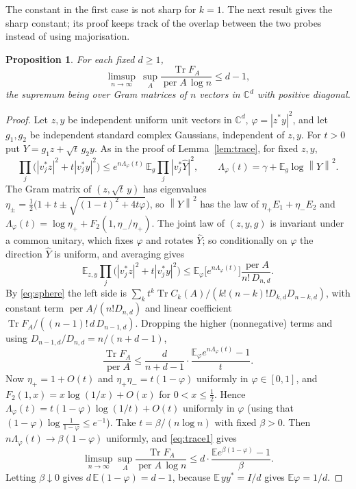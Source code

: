 \documentclass[11pt,a4paper]{article}
\newtheorem{proposition}[theorem]{Proposition}
\theoremstyle{remark}
\newcommand{\per}{\operatorname{per}}
\newcommand{\Tr}{\operatorname{Tr}}
\newcommand{\norm}[1]{\left\lVert#1\right\rVert}
\newcommand{\C}{\mathbb C}
\newcommand{\E}{\mathbb E}
\begin{document}
The constant in the first case is not sharp for $k=1$. The next result gives the sharp constant; its proof keeps track of the overlap between the two probes instead of using majorisation.
\begin{proposition}\label{prop:trace1}
For each fixed $d\ge1$,
\[
 \limsup_{n\to\infty}\ \sup_A\frac{\Tr F_A}{\per A\,\log n}\le d-1,
\]
the supremum being over Gram matrices of $n$ vectors in $\C^d$ with positive diagonal.
\end{proposition}
\begin{proof}
Let $z,y$ be independent uniform unit vectors in $\C^d$, $\varphi=|z^*y|^2$, and let $g_1,g_2$ be independent standard complex Gaussians, independent of $z,y$. For $t>0$ put $Y=g_1z+\sqrt t\,g_2y$. As in the proof of Lemma~\ref{lem:trace}, for fixed $z,y$,
\[
 \prod_j\bigl(|v_j^*z|^2+t|v_j^*y|^2\bigr)\le e^{n\Lambda_\varphi(t)}\,\E_g\prod_j|v_j^*\hat Y|^2,
 \qquad \Lambda_\varphi(t)=\gamma+\E_g\log\norm Y^2 .
\]
The Gram matrix of $(z,\sqrt t\,y)$ has eigenvalues $\eta_\pm=\frac12\bigl(1+t\pm\sqrt{(1-t)^2+4t\varphi}\bigr)$, so $\norm Y^2$ has the law of $\eta_+E_1+\eta_-E_2$ and $\Lambda_\varphi(t)=\log\eta_++F_2(1,\eta_-/\eta_+)$. The joint law of $(z,y,g)$ is invariant under a common unitary, which fixes $\varphi$ and rotates $\hat Y$; so conditionally on $\varphi$ the direction $\hat Y$ is uniform, and averaging gives
\[
 \E_{z,y}\prod_j\bigl(|v_j^*z|^2+t|v_j^*y|^2\bigr)\le\E_\varphi\bigl[e^{n\Lambda_\varphi(t)}\bigr]\frac{\per A}{n!\,D_{n,d}} .
\]
By \eqref{eq:sphere} the left side is $\sum_kt^k\Tr C_k(A)/(k!(n-k)!D_{k,d}D_{n-k,d})$, with constant term $\per A/(n!D_{n,d})$ and linear coefficient $\Tr F_A/((n-1)!\,d\,D_{n-1,d})$. Dropping the higher (nonnegative) terms and using $D_{n-1,d}/D_{n,d}=n/(n+d-1)$,
\begin{equation}\label{eq:trace1}
 \frac{\Tr F_A}{\per A}\le\frac d{n+d-1}\cdot\frac{\E_\varphi e^{n\Lambda_\varphi(t)}-1}t .
\end{equation}
Now $\eta_+=1+O(t)$ and $\eta_+\eta_-=t(1-\varphi)$ uniformly in $\varphi\in[0,1]$, and $F_2(1,x)=x\log(1/x)+O(x)$ for $0<x\le\frac12$. Hence $\Lambda_\varphi(t)=t(1-\varphi)\log(1/t)+O(t)$ uniformly in $\varphi$ (using that $(1-\varphi)\log\frac1{1-\varphi}\le e^{-1}$). Take $t=\beta/(n\log n)$ with fixed $\beta>0$. Then $n\Lambda_\varphi(t)\to\beta(1-\varphi)$ uniformly, and \eqref{eq:trace1} gives
\[
 \limsup_{n\to\infty}\sup_A\frac{\Tr F_A}{\per A\,\log n}\le d\cdot\frac{\E e^{\beta(1-\varphi)}-1}\beta .
\]
Letting $\beta\downarrow0$ gives $d\,\E(1-\varphi)=d-1$, because $\E\,yy^*=I/d$ gives $\E\varphi=1/d$.
\end{proof}
\end{document}
